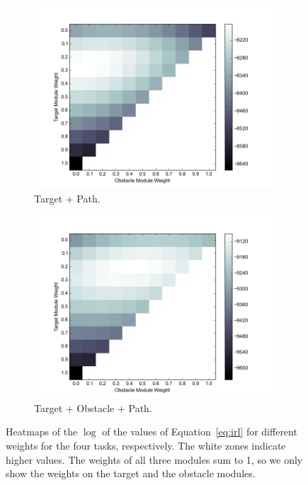 \documentclass[11pt]{article} %
\begin{document}
\begin{figure}[h!]
\begin{subfigure}[b]{0.4\textwidth}
\includegraphics[width=\textwidth]{objValuesTask3.png}
\caption{Target + Path. }
\end{subfigure}
\begin{subfigure}[b]{0.4\textwidth}
\includegraphics[width=\textwidth]{objValuesTask4.png}
\caption{Target + Obstacle + Path. }
\end{subfigure}
\caption{Heatmaps of the $\log$ of the values of Equation~\ref{eq:irl} for different
weights for the four tasks, respectively. The white zones indicate higher
values. The weights of all three modules sum to 1, so we only show the weights
on the target and the obstacle modules.
}
\label{fig:heatmap}
\end{figure}
\end{document}
